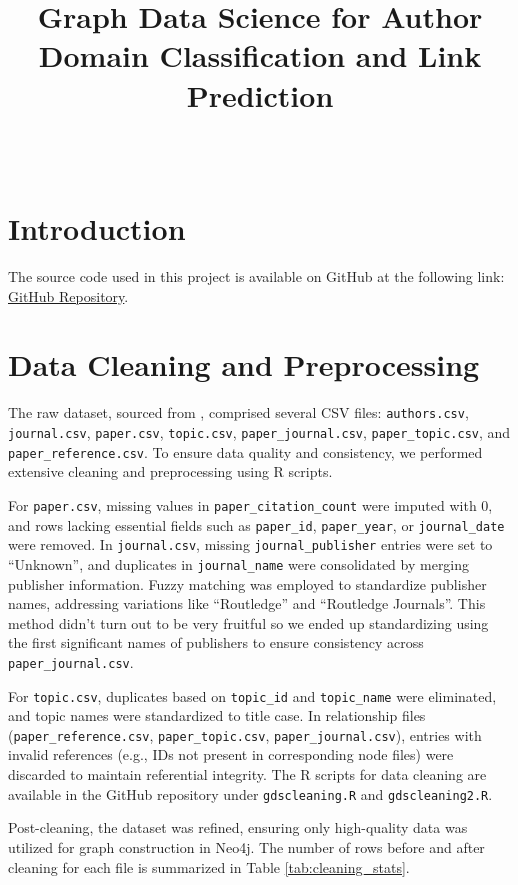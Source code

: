 \documentclass[conference, 12pt]{IEEEtran}
\title{Graph Data Science for Author Domain Classification and Link Prediction}
\author{\IEEEauthorblockN{Basil Ali Khan, Hamza Ansari, Hayyan Khan} \\
\IEEEauthorblockA{Group 6\\ Graph Data Science, Spring 2025}}
\begin{document}
\maketitle

\section{Introduction}
The source code used in this project is available on GitHub at the following link: 
\href{https://github.com/basil-ali-khan/Node_Classification_and_Link_Prediction_Using_Neo4}{GitHub Repository}.

\section{Data Cleaning and Preprocessing}
The raw dataset, sourced from \cite{10.1162/qss_a_00163}, comprised several CSV files: \texttt{authors.csv}, \texttt{journal.csv}, \texttt{paper.csv}, \texttt{topic.csv}, \texttt{paper\_journal.csv}, \texttt{paper\_topic.csv}, and \texttt{paper\_reference.csv}. To ensure data quality and consistency, we performed extensive cleaning and preprocessing using R scripts.

For \texttt{paper.csv}, missing values in \texttt{paper\_citation\_count} were imputed with 0, and rows lacking essential fields such as \texttt{paper\_id}, \texttt{paper\_year}, or \texttt{journal\_date} were removed. In \texttt{journal.csv}, missing \texttt{journal\_publisher} entries were set to ``Unknown'', and duplicates in \texttt{journal\_name} were consolidated by merging publisher information. Fuzzy matching was employed to standardize publisher names, addressing variations like ``Routledge'' and ``Routledge Journals''. This method didn't turn out to be very fruitful so we ended up standardizing using the first significant names of publishers to ensure consistency across \texttt{paper\_journal.csv}.

For \texttt{topic.csv}, duplicates based on \texttt{topic\_id} and \texttt{topic\_name} were eliminated, and topic names were standardized to title case. In relationship files (\texttt{paper\_reference.csv}, \texttt{paper\_topic.csv}, \texttt{paper\_journal.csv}), entries with invalid references (e.g., IDs not present in corresponding node files) were discarded to maintain referential integrity. The R scripts for data cleaning are available in the GitHub repository under \texttt{gdscleaning.R} and \texttt{gdscleaning2.R}.

Post-cleaning, the dataset was refined, ensuring only high-quality data was utilized for graph construction in Neo4j. The number of rows before and after cleaning for each file is summarized in Table \ref{tab:cleaning_stats}. 
\end{document}
